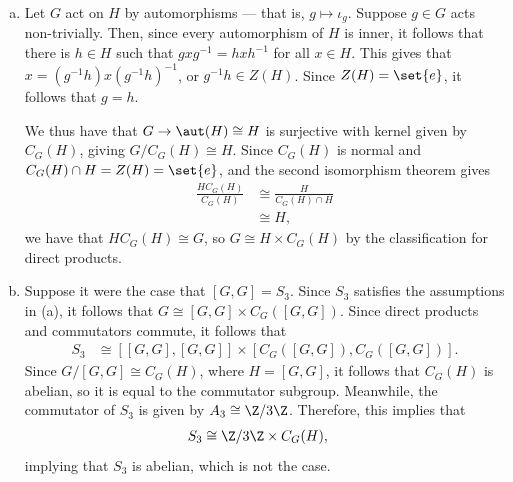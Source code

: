 \documentclass[10pt]{mypackage}
\begin{document}
\begin{solution}\hfill
  \begin{enumerate}[(a)]
    \item Let $G$ act on $H$ by automorphisms --- that is, $g\mapsto \iota_g$. Suppose $g\in G$ acts non-trivially. Then, since every automorphism of $H$ is inner, it follows that there is $h\in H$ such that $gxg^{-1} = hxh^{-1}$ for all $x\in H$. This gives that $x = \left( g^{-1}h \right)x\left( g^{-1}h \right)^{-1}$, or $g^{-1}h\in Z(H)$. Since $Z(H) = \set{e}$, it follows that $g = h$.

      We thus have that $G\rightarrow \aut(H)\cong H$ is surjective with kernel given by $C_G(H)$, giving $G/C_G(H) \cong H$. Since $C_G(H)$ is normal and $C_G(H)\cap H = Z(H) = \set{e}$, and the second isomorphism theorem gives
      \begin{align*}
        \frac{HC_G(H)}{C_G(H)} &\cong \frac{H}{C_G(H)\cap H}\\
                               &\cong H,
      \end{align*}
      we have that $HC_G(H)\cong G$, so $G\cong H\times C_G(H)$ by the classification for direct products.
    \item Suppose it were the case that $\left[ G,G \right] = S_3$. Since $S_3$ satisfies the assumptions in (a), it follows that $G\cong \left[ G,G \right]\times C_G\left( \left[ G,G \right] \right)$. Since direct products and commutators commute, it follows that
      \begin{align*}
        S_3 &\cong \left[ \left[ G,G \right],\left[ G,G \right] \right]\times \left[ C_G\left( \left[ G,G \right] \right),C_G\left( \left[ G,G \right] \right) \right].
      \end{align*}
      Since $G/\left[ G,G \right]\cong C_G(H)$, where $H = \left[ G,G \right]$, it follows that $C_G\left( H \right)$ is abelian, so it is equal to the commutator subgroup. Meanwhile, the commutator of $S_3$ is given by $A_3\cong \Z/3\Z$. Therefore, this implies that
      \begin{align*}
        S_3 &\cong \Z/3\Z\times C_G(H),
      \end{align*}
      implying that $S_3$ is abelian, which is not the case.
  \end{enumerate}
\end{solution}
\end{document}
